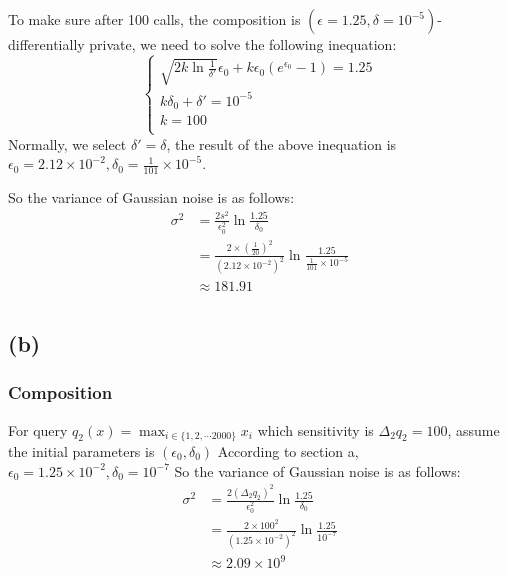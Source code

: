 \documentclass[a4paper,12pt]{article}
\begin{document}
To make sure after 100 calls, the composition is $(\epsilon = 1.25, \delta = 10^{-5})$-differentially private, we need to solve the following inequation:
\begin{equation}
    \begin{cases}
        \sqrt{2k\ln{\frac{1}{\delta'}}}\epsilon_0 + k\epsilon_0(e^{\epsilon_0} - 1) = 1.25 \\
        k\delta_0 + \delta' = 10^{-5}                                                      \\
        k = 100                                                                            \\
    \end{cases}
\end{equation}
Normally, we select $\delta' = \delta$, the result of the above inequation is $\epsilon_0 = 2.12 \times 10^{-2}, \delta_0 =\frac{1}{101}\times 10^{-5}$.

So the variance of Gaussian noise is as follows:
\begin{equation}
    \begin{aligned}
        \sigma^2 & = \frac{2s^2}{\epsilon_0^2}\ln{\frac{1.25}{\delta_0}}                                                   \\
                 & = \frac{2\times (\frac{1}{20})^2}{(2.12 \times 10^{-2})^2}\ln{\frac{1.25}{\frac{1}{101}\times 10^{-5}}} \\
                 & \approx 181.91                                                                                          \\
    \end{aligned}
\end{equation}

\subsection{(b)}
\subsubsection{Composition}
For query $q_2(x) = \max_{i\in \{1, 2, \cdots 2000\}}x_i$ which sensitivity is
$\Delta_2q_2 = 100$, assume the initial parameters is $(\epsilon_0, \delta_0)$
According to section a, $\epsilon_0 = 1.25 \times 10^{-2}, \delta_0 = 10^{-7}$
So the variance of Gaussian noise is as follows:
\begin{equation}
    \begin{aligned}
        \sigma^2 & = \frac{2(\Delta_2q_2)^2}{\epsilon_0^2}\ln{\frac{1.25}{\delta_0}}        \\
                 & = \frac{2\times 100^2}{(1.25 \times 10^{-2})^2}\ln{\frac{1.25}{10^{-7}}} \\
                 & \approx 2.09\times 10^9                                                  \\
    \end{aligned}
\end{equation}
\end{document}
